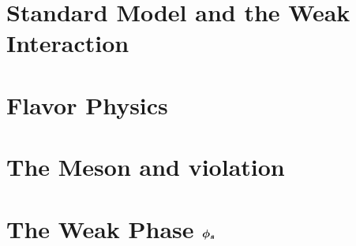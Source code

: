 \section{Standard Model and the Weak Interaction}
\label{The_Standard_Model}


\section{Flavor Physics}
\label{Flavor_Physics}


\section{The \Bs Meson and \CP violation}
\label{Phenomenology}


\section{The Weak Phase $\boldsymbol{\phi_{s}}$}
\label{WeakPhase}


